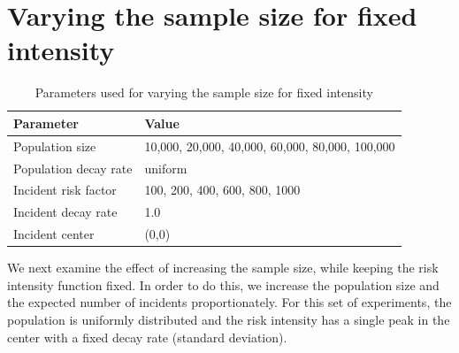 \section{Varying the sample size for fixed intensity}
\label{sec:results:unifNpop_1h}

\begin{table}[htbp]
\centering
\begin{tabular}{ll}
\hline
Parameter & Value \\
\hline
Population size & 10,000, 20,000, 40,000, 60,000, 80,000, 100,000 \\
Population decay rate & uniform \\
Incident risk factor & 100, 200, 400, 600, 800, 1000 \\
Incident decay rate & 1.0 \\
Incident center & (0,0) \\
\hline
\end{tabular}
\caption{Parameters used for varying the sample size for fixed intensity}
\label{tab:params:unifNpop_1h}
\end{table}


We next examine the effect of increasing the sample size, while keeping the risk intensity function fixed.
In order to do this, we increase the population size and the expected number of incidents proportionately.
For this set of experiments, the population is uniformly distributed and the risk intensity has a single peak in the center with a fixed decay rate (standard deviation).

